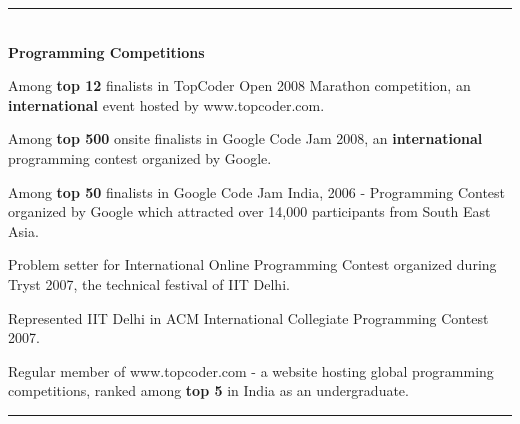 \documentclass[10pt]{article}
\newenvironment{itemize*}%
  {\begin{itemize}%
    \setlength{\itemsep}{0pt}%
    \setlength{\parskip}{0pt}%
	}
  {\end{itemize}}
\begin{document}
\rule{6.5in}{2pt}
\\
{\large \textbf{Programming Competitions}}
\begin{itemize*}
  \item Among \textbf{top 12} finalists in TopCoder Open 2008 Marathon competition, an \textbf{international} event hosted by www.topcoder.com. 
  \item Among \textbf{top 500} onsite finalists in Google Code Jam 2008, an \textbf{international} programming contest organized by Google.
  \item Among \textbf{top 50} finalists in Google Code Jam India, 2006 - Programming Contest organized by Google which attracted over 14,000 participants from South East Asia.
  \item Problem setter for International Online Programming Contest organized during Tryst 2007, the technical festival of IIT Delhi. 
  \item Represented IIT Delhi in ACM International Collegiate Programming Contest 2007. 
  \item Regular member of www.topcoder.com - a website hosting global programming competitions, ranked among \textbf{top 5} in India as an undergraduate.
\end{itemize*}

\rule{6.5in}{2pt}
\end{document}
